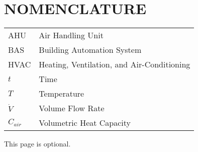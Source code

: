 %
%
%


\chapter*{\texorpdfstring{\MakeUppercase{NOMENCLATURE}}{NOMENCLATURE}}

\begin{tabular}{ll}
AHU  & Air Handling Unit\tabularnewline
BAS & Building Automation System\tabularnewline
HVAC & Heating, Ventilation, and Air-Conditioning\tabularnewline
\(t\)  & Time\tabularnewline
\(T\) & Temperature\tabularnewline
\(\dot{V}\) & Volume Flow Rate \tabularnewline 
\(C_{air}\) & Volumetric Heat Capacity \tabularnewline
\end{tabular}


\vspace{2em}

This page is optional.

\pagebreak{}
